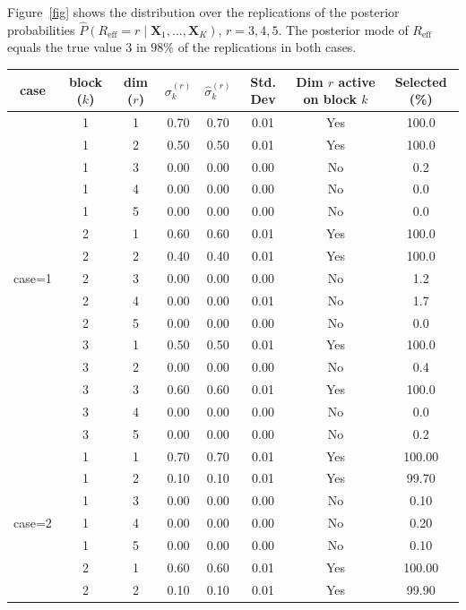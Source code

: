 \documentclass[11pt]{article}
\newcommand{\X}{\mathbf{X}}
\begin{document}
Figure~\ref{fig} shows the distribution over the replications of the posterior probabilities $\hat P(R_{\mathrm{eff}}=r\mid\X_1,\ldots,\X_K)$, $r=3,4,5$. The posterior mode of $R_{\mathrm{eff}}$ equals the true value $3$ in $98\%$ of the replications in both cases.



\begin{table}[ht]
\centering
\begin{tabular}{c|ccccccc}
  \hline
 case&  block ($k$) & dim ($r$) & $\sigma_k^{(r)}$ & $\hat \sigma_k^{(r)}$ & Std. Dev & Dim $r$ active on block $k$ & Selected (\%) \\ 
  \hline
\multirow{15}{*}{case=1} & 1 &   1 & 0.70 & 0.70 & 0.01 & Yes & 100.0 \\ 
 & 1 &   2 & 0.50 & 0.50 & 0.01 & Yes & 100.0 \\ 
 & 1 &   3 & 0.00 & 0.00 & 0.00 & No & 0.2 \\ 
 & 1 &   4 & 0.00 & 0.00 & 0.00 & No & 0.0 \\ 
 & 1 &   5 & 0.00 & 0.00 & 0.00 & No & 0.0 \\ 
 & 2 &   1 & 0.60 & 0.60 & 0.01 & Yes & 100.0 \\ 
 & 2 &   2 & 0.40 & 0.40 & 0.01 & Yes & 100.0 \\ 
 & 2 &   3 & 0.00 & 0.00 & 0.00 & No & 1.2 \\ 
 & 2 &   4 & 0.00 & 0.00 & 0.01 & No & 1.7 \\ 
 & 2 &   5 & 0.00 & 0.00 & 0.00 & No & 0.0 \\ 
 & 3 &   1 & 0.50 & 0.50 & 0.01 & Yes & 100.0 \\ 
 & 3 &   2 & 0.00 & 0.00 & 0.00 & No & 0.4 \\ 
 & 3 &   3 & 0.60 & 0.60 & 0.01 & Yes & 100.0 \\ 
 & 3 &   4 & 0.00 & 0.00 & 0.00 & No & 0.0 \\ 
 & 3 &   5 & 0.00 & 0.00 & 0.00 & No & 0.2 \\ 
   \hline
\multirow{15}{*}{case=2} & 1 &   1 & 0.70 & 0.70 & 0.01 & Yes & 100.00 \\ 
 & 1 &   2 & 0.10 & 0.10 & 0.01 & Yes & 99.70 \\ 
 & 1 &   3 & 0.00 & 0.00 & 0.00 & No & 0.10 \\ 
 & 1 &   4 & 0.00 & 0.00 & 0.00 & No & 0.20 \\ 
 & 1 &   5 & 0.00 & 0.00 & 0.00 & No & 0.10 \\ 
 & 2 &   1 & 0.60 & 0.60 & 0.01 & Yes & 100.00 \\ 
 & 2 &   2 & 0.10 & 0.10 & 0.01 & Yes & 99.90 \\ 

\end{tabular}
\end{table}
\end{document}
